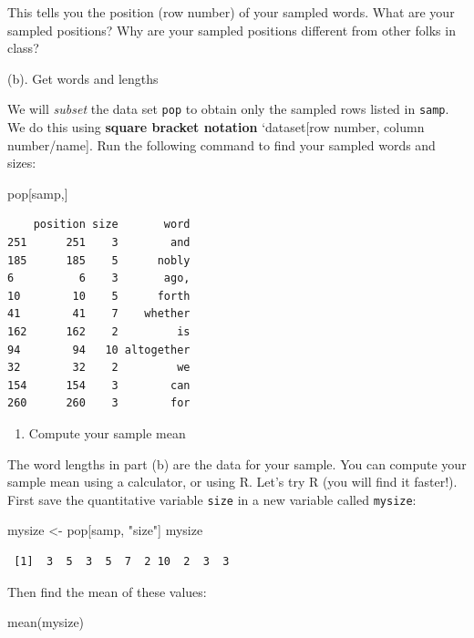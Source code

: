 \documentclass[
]{book}
\newenvironment{Shaded}{\begin{snugshade}}{\end{snugshade}}
\newcommand{\FunctionTok}[1]{\textcolor[rgb]{0.00,0.00,0.00}{#1}}
\newcommand{\NormalTok}[1]{#1}
\newcommand{\OtherTok}[1]{\textcolor[rgb]{0.56,0.35,0.01}{#1}}
\newcommand{\StringTok}[1]{\textcolor[rgb]{0.31,0.60,0.02}{#1}}
\providecommand{\tightlist}{%
  \setlength{\itemsep}{0pt}\setlength{\parskip}{0pt}}
\begin{document}
This tells you the position (row number) of your sampled words. What are your sampled positions? Why are your sampled positions different from other folks in class?

(b). Get words and lengths

We will \emph{subset} the data set \texttt{pop} to obtain only the sampled rows listed in \texttt{samp}. We do this using \textbf{square bracket notation} `dataset{[}row number, column number/name{]}. Run the following command to find your sampled words and sizes:

\begin{Shaded}
\begin{Highlighting}[]
\NormalTok{pop[samp,]}
\end{Highlighting}
\end{Shaded}

\begin{verbatim}
    position size       word
251      251    3        and
185      185    5      nobly
6          6    3       ago,
10        10    5      forth
41        41    7    whether
162      162    2         is
94        94   10 altogether
32        32    2         we
154      154    3        can
260      260    3        for
\end{verbatim}

\begin{enumerate}
\def\labelenumi{\alph{enumi}.}
\setcounter{enumi}{2}
\tightlist
\item
  Compute your sample mean
\end{enumerate}

The word lengths in part (b) are the data for your sample. You can compute your sample mean using a calculator, or using R. Let's try R (you will find it faster!). First save the quantitative variable \texttt{size} in a new variable called \texttt{mysize}:

\begin{Shaded}
\begin{Highlighting}[]
\NormalTok{mysize }\OtherTok{\textless{}{-}}\NormalTok{ pop[samp, }\StringTok{"size"}\NormalTok{]}
\NormalTok{mysize}
\end{Highlighting}
\end{Shaded}

\begin{verbatim}
 [1]  3  5  3  5  7  2 10  2  3  3
\end{verbatim}

Then find the mean of these values:

\begin{Shaded}
\begin{Highlighting}[]
\FunctionTok{mean}\NormalTok{(mysize)}
\end{Highlighting}
\end{Shaded}
\end{document}
